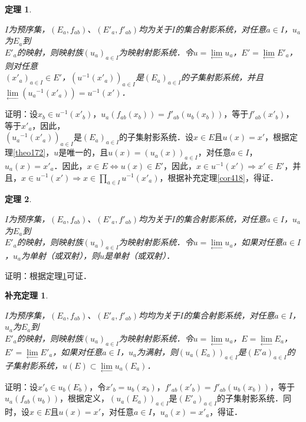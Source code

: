 \documentclass[12pt, a4paper, oneside]{book}
\newtheorem{theo}{定理}
\newtheorem{cor}{补充定理}
\begin{document}
			\begin{theo}\label{theo175}
				\hfill\par
				$I$为预序集，$(E_a, f_{ab})$、$({E'}_a, {f'}_{ab})$均为关于$I$的集合射影系统，对任意$a\in I$，$u_a$为$E_a$到\\${E'}_a$的映射，则映射族$(u_a)_{a\in I}$为映射射影系统．令$u=\lim\limits_\gets u_a$，$E'=\lim\limits_\gets {E'}_a$，则对任意\\$({x'}_a)_{a\in I}\in E'$，$(u^{-1}({x'}_a))_{a\in I}$是$(E_a)_{a\in I}$的子集射影系统，并且$\lim\limits_\gets({u_a}^{-1}({x'}_a))=u^{-1}(x')$．
			\end{theo}
			证明：设$x_b\in u^{-1}({x'}_b)$，$u_a(f_{ab}(x_b))={f'}_{ab}(u_b(x_b))$，等于${f'}_{ab}({x'}_b)$，等于${x'}_a$，因此，\\$({u_a}^{-1}({x'}_a))_{a\in I}$是$(E_a)_{a\in I}$的子集射影系统．设$x\in E$且$u(x)=x'$，根据定理\ref{theo172}，$u$是唯一的，且$u(x)=(u_a(x))_{a\in I}$，对任意$a\in I$，$u_a(x)={x'}_a$．因此，$x\in E\Leftrightarrow u(x)\in E'$，因此，$x\in u^{-1}(x')\Rightarrow x'\in E'$，并且，$x\in u^{-1}(x')\Rightarrow x\in \prod\limits_{a\in I}u^{-1}({x'}_a)$，根据补充定理\ref{cor418}，得证．			
					
			\begin{theo}\label{theo176}
				\hfill\par
				$I$为预序集，$(E_a, f_{ab})$、$({E'}_a, {f'}_{ab})$均为关于$I$的集合射影系统，对任意$a\in I$，$u_a$为$E_a$到\\${E'}_a$的映射，则映射族$(u_a)_{a\in I}$为映射射影系统．令$u=\lim\limits_\gets u_a$，如果对任意$a\in I$，$u_a$为单射（或双射），则$u$是单射（或双射）．
			\end{theo}
			证明：根据定理\ref{theo175}可证．
			
			\begin{cor}\label{cor419}
				\hfill\par
				$I$为预序集，$(E_a, f_{ab})$、$({E'}_a, {f'}_{ab})$均均为关于$I$的集合射影系统，对任意$a\in I$，$u_a$为$E_a$到\\${E'}_a$的映射，则映射族$(u_a)_{a\in I}$为映射射影系统．令$u=\lim\limits_\gets u_a$，$E=\lim\limits_\gets E_a$，$E'=\lim\limits_\gets {E'}_a$，如果对任意$a\in I$，$u_a$为满射，则$(u_a(E_a))_{a\in I}$是$(E'a)_{a\in I}$的子集射影系统，$u(E)\subset \lim\limits_\gets u_a(E_a)$．
			\end{cor}
			证明：设${x'}_b\in u_b(E_b)$，令${x'}_b= u_b(x_b)$，${f'}_{ab}({x'}_b)= {f'}_{ab}(u_b(x_b))$，等于$u_a(f_{ab}(u_b))$，根据定义，$(u_a(E_a))_{ a\in I}$是$({E'}_a)_{a\in I}$的子集射影系统．同时，设$x\in E$且$u(x)=x'$，对任意$a\in I$，$u_a(x)={x'}_a$，得证．
					
\end{document}
